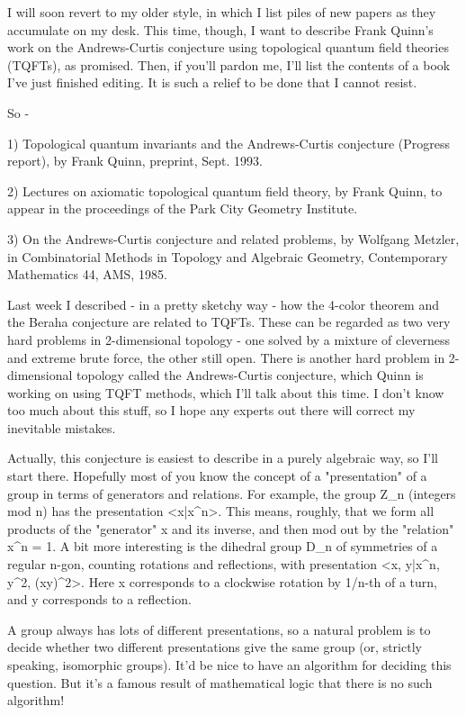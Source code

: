 

I will soon revert to my older style, in which I list piles of new
papers as they accumulate on my desk.  This time, though, I want to
describe Frank Quinn's work on the Andrews-Curtis conjecture using
topological quantum field theories (TQFTs), as promised.  Then, if
you'll pardon me, I'll list the contents of a book I've just finished
editing.  It is such a relief to be done that I cannot resist.

So -

1) Topological quantum invariants and the Andrews-Curtis conjecture
(Progress report), by Frank Quinn, preprint, Sept. 1993.

2) Lectures on axiomatic topological quantum field theory, by Frank
Quinn, to appear in the proceedings of the Park City Geometry Institute.

3) On the Andrews-Curtis conjecture and related problems, by Wolfgang
Metzler, in Combinatorial Methods in Topology and Algebraic Geometry,
Contemporary Mathematics 44, AMS, 1985. 

Last week I described - in a pretty sketchy way - how the 4-color
theorem and the Beraha conjecture are related to TQFTs.  These can be
regarded as two very hard problems in 2-dimensional topology - one
solved by a mixture of cleverness and extreme brute force, the other
still open.  There is another hard problem in 2-dimensional topology
called the Andrews-Curtis conjecture, which Quinn is working on using TQFT
methods, which I'll talk about this time.  I don't know too much about
this stuff, so I hope any experts out there will correct my inevitable
mistakes.  

Actually, this conjecture is easiest to describe in a purely algebraic
way, so I'll start there.  Hopefully most of you know the concept of a
"presentation" of a group in terms of generators and relations.  For
example, the group Z_n (integers mod n) has the presentation <x|x^n>.
This means, roughly, that we form all products of the "generator" x and
its inverse, and then mod out by the "relation" x^n = 1.  A bit more
interesting is the dihedral group D_n of symmetries of a regular n-gon,
counting rotations and reflections, with presentation <x, y|x^n, y^2,
(xy)^2>.  Here x corresponds to a clockwise rotation by 1/n-th of a
turn, and y corresponds to a reflection.  

A group always has lots of different presentations, so a natural 
problem is to decide whether two different presentations give the
same group (or, strictly speaking, isomorphic groups).  It'd be nice to
have an algorithm for deciding this question.  But it's a famous result
of mathematical logic that there is no such algorithm!  

